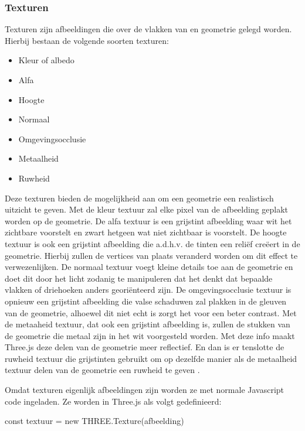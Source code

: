 \subsubsection{Texturen}

Texturen zijn afbeeldingen die over de vlakken van en geometrie gelegd worden. Hierbij bestaan de volgende soorten texturen: 

\begin{itemize}
\item Kleur of albedo
\item Alfa
\item Hoogte
\item Normaal
\item Omgevingsocclusie
\item Metaalheid
\item Ruwheid
\end{itemize}

Deze texturen bieden de mogelijkheid aan om een geometrie een realistisch uitzicht te geven. Met de kleur textuur zal elke pixel van de afbeelding geplakt worden op de geometrie. De alfa textuur is een grijstint afbeelding waar wit het zichtbare voorstelt en zwart hetgeen wat niet zichtbaar is voorstelt. De hoogte textuur is ook een grijstint afbeelding die a.d.h.v. de tinten een reliëf creëert in de geometrie. Hierbij zullen de vertices van plaats veranderd worden om dit effect te verwezenlijken. De normaal textuur voegt kleine details toe aan de geometrie en doet dit door het licht zodanig te manipuleren dat het denkt dat bepaalde vlakken of driehoeken anders georiënteerd zijn. De omgevingsocclusie textuur is opnieuw een grijstint afbeelding die valse schaduwen zal plakken in de gleuven van de geometrie, alhoewel dit niet echt is zorgt het voor een beter contrast. Met de metaaheid textuur, dat ook een grijstint afbeelding is, zullen de stukken van de geometrie die metaal zijn in het wit voorgesteld worden. Met deze info maakt Three.js deze delen van de geometrie meer reflectief. En dan is er tenslotte de ruwheid textuur die grijstinten gebruikt om op dezelfde manier als de metaalheid textuur delen van de geometrie een ruwheid te geven \autocite{Simon2023}.

Omdat texturen eigenlijk afbeeldingen zijn worden ze met normale Javascript code ingeladen. Ze worden in Three.js als volgt gedefinieerd:

\begin{LVerbatim}
const textuur = new THREE.Texture(afbeelding)
\end{LVerbatim}

